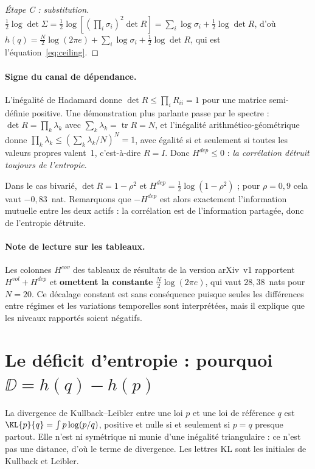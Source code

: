 \begin{proof}[Étape C : substitution]
$\tfrac12\log\det\Sigma
=\tfrac12\log\!\left[\left(\prod_i\sigma_i\right)^2\det R\right]
=\sum_i\log\sigma_i+\tfrac12\log\det R$, d'où
$h(q)=\tfrac N2\log(2\pi e)+\sum_i\log\sigma_i+\tfrac12\log\det R$, qui est
l'équation~\eqref{eq:ceiling}.
\end{proof}

\paragraph{Signe du canal de dépendance.} L'inégalité de Hadamard donne
$\det R\le\prod_i R_{ii}=1$ pour une matrice semi-définie positive. Une
démonstration plus parlante passe par le spectre : $\det R=\prod_k\lambda_k$
avec $\sum_k\lambda_k=\operatorname{tr}R=N$, et l'inégalité arithmético-géométrique
donne $\prod_k\lambda_k\le\left(\sum_k\lambda_k/N\right)^N=1$, avec égalité si
et seulement si toutes les valeurs propres valent~1, c'est-à-dire $R=I$. Donc
$H^{dep}\le0$ : \emph{la corrélation détruit toujours de l'entropie}.

Dans le cas bivarié, $\det R=1-\rho^2$ et $H^{dep}=\tfrac12\log(1-\rho^2)$ ; pour
$\rho=0{,}9$ cela vaut $-0{,}83$~nat. Remarquons que $-H^{dep}$ est alors
exactement l'information mutuelle entre les deux actifs : la corrélation est de
l'information partagée, donc de l'entropie détruite.

\paragraph{Note de lecture sur les tableaux.} Les colonnes $H^{cov}$ des
tableaux de résultats de la version arXiv~v1 rapportent $H^{vol}+H^{dep}$ et
\textbf{omettent la constante} $\tfrac N2\log(2\pi e)$, qui vaut $28{,}38$~nats
pour $N=20$. Ce décalage constant est sans conséquence puisque seules les
différences entre régimes et les variations temporelles sont interprétées, mais
il explique que les niveaux rapportés soient négatifs.

\section{Le déficit d'entropie : pourquoi $\DD=h(q)-h(p)$}
\label{app:deficit}

La divergence de Kullback--Leibler entre une loi $p$ et une loi de référence $q$
est $\KL{p}{q}=\int p\log(p/q)$, positive et nulle si et seulement si $p=q$
presque partout. Elle n'est ni symétrique ni munie d'une inégalité triangulaire :
ce n'est pas une distance, d'où le terme de divergence. Les lettres \og KL \fg{}
sont les initiales de Kullback et Leibler.

